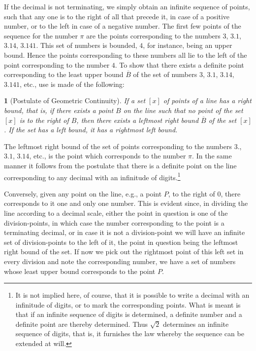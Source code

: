 \documentclass[a4paper,12pt]{book}[2004/02/16]
\providecommand{\colorbox}[2]{#2}
\newcommand{\correction}[2]{\colorbox{corr}{#1}}
\theoremstyle{ilemma}
\theoremstyle{itheorem}
\theoremstyle{iother}
\newtheorem{other}{}
\theoremstyle{icorollary}
\theoremstyle{numcorollary}
\theoremstyle{idefinition}
\begin{document}
If the decimal is not terminating, we simply obtain an infinite
sequence of points, such that any one is to the right of all that
precede it, in case of a positive number, or to the
left in case of a negative number. The first few points of the
sequence for the number $\pi$ are the points corresponding to the
numbers $3$, $3.1$, $3.14$, $3.141$. This set of numbers is bounded,
$4$, for instance, being an upper bound. Hence the points
corresponding to these numbers all lie to the left of the point
corresponding to the number $4$. To show that there exists a definite
point corresponding to the least upper bound \correction{$\overline{B}$}{$B$} of the set of numbers
$3$, $3.1$, $3.14$, $3.141$, etc., use is made of the following:

\begin{other}[Postulate of Geometric Continuity]If a set $[x]$
of points of a line has a right bound, that is, if there exists a
point $B$ on the line such that no point of the set $[x]$ is to the
right of $B$, then there exists a leftmost right bound $\overline{B}$
of the set $[x]$. If the set has a left bound, it has a rightmost left
bound.
\end{other}
The leftmost right bound of the set of points corresponding to the
numbers $3.$, $3.1$, $3.14$, etc., is the point which corresponds to
the number $\pi$. In the same manner it follows from the postulate
that there is a definite point on the line corresponding to any
decimal with an infinitude of digits.\footnote{%
  It is not implied here, of course, that it is possible to write a
  decimal with an infinitude of digits, or to mark the corresponding
  points. What is meant is that if an infinite sequence of digits is
  determined, a definite number and a definite point are thereby
  determined. Thus $\sqrt{2}$ determines an infinite sequence of
  digits, that is, it furnishes the law whereby the sequence can be
  extended at will.}

Conversely, given any point on the line, e.g., a point $P$, to the
right of $0$, there corresponds to it one and only one number.  This
is evident since, in dividing the line according to a decimal scale,
either the point in question is one of the division-points, in which
case the number corresponding to the point is a terminating decimal,
or in case it is not a division-point we will have an infinite set of
division\correction{-}{ }points to the left of it, the point in question being the
leftmost right bound of the set. If now we pick out the rightmost
point of this left set in every division and note the corresponding
number, we have a set of numbers whose least upper bound corresponds
to the point $P$.
\end{document}
